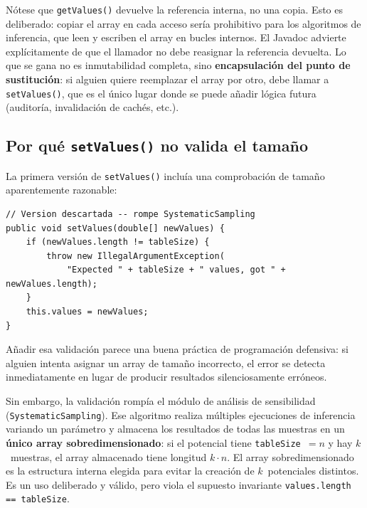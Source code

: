 \documentclass[11pt,a4paper]{article}
\newcommand{\code}[1]{\texttt{#1}}
\begin{document}
Nótese que \code{getValues()} devuelve la referencia interna, no una
copia.  Esto es deliberado: copiar el array en cada acceso sería
prohibitivo para los algoritmos de inferencia, que leen y escriben el
array en bucles internos.  El Javadoc advierte explícitamente de que
el llamador no debe reasignar la referencia devuelta.  Lo que se gana
no es inmutabilidad completa, sino \textbf{encapsulación del punto de
sustitución}: si alguien quiere reemplazar el array por otro, debe
llamar a \code{setValues()}, que es el único lugar donde se puede
añadir lógica futura (auditoría, invalidación de cachés, etc.).

\subsection{Por qué \texttt{setValues()} no valida el tamaño}
\label{sec:setvalues-sin-validacion}

La primera versión de \code{setValues()} incluía una comprobación de
tamaño aparentemente razonable:

\begin{lstlisting}[caption={Validación de tamaño que se consideró y se descartó.},
                   label=lst:setvalues-validacion]
// Version descartada -- rompe SystematicSampling
public void setValues(double[] newValues) {
    if (newValues.length != tableSize) {
        throw new IllegalArgumentException(
            "Expected " + tableSize + " values, got " + newValues.length);
    }
    this.values = newValues;
}
\end{lstlisting}

Añadir esa validación parece una buena práctica de programación
defensiva: si alguien intenta asignar un array de tamaño incorrecto,
el error se detecta inmediatamente en lugar de producir resultados
silenciosamente erróneos.

Sin embargo, la validación rompía el módulo de análisis de
sensibilidad (\code{SystematicSampling}).  Ese algoritmo realiza
múltiples ejecuciones de inferencia variando un parámetro y almacena
los resultados de todas las muestras en un \textbf{único array
sobredimensionado}: si el potencial tiene \code{tableSize}~$= n$ y
hay $k$~muestras, el array almacenado tiene longitud $k \cdot n$.  El
array sobredimensionado es la estructura interna elegida para evitar
la creación de $k$~potenciales distintos.  Es un uso deliberado y
válido, pero viola el supuesto invariante \code{values.length ==
tableSize}.
\end{document}
